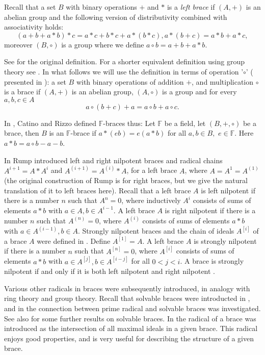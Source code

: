 \documentclass[12pt]{article}
\begin{document}
Recall that a set $B$ with binary operations $+$ and $* $ is a {\em  left brace} if $(A, +)$ is an abelian group and the following version of distributivity combined with associativity holds:
  \[(a+b+a*b)* c=a* c+b* c+a* (b* c), a* (b+c)=a* b+a* c,\]
 moreover  $(B, \circ )$ is a group where we define $a\circ b=a+b+a* b$.

 See \cite{rump} for the original definition. For a shorter equivalent  definition using group theory see \cite{cjo}.
In what follows we will use the definition in terms of operation '$\circ $' ( presented in \cite{cjo}): a set $B$ with binary operations of addition $+$, and multiplication $\circ $ is a brace if $(A, +)$ is an abelian group, $(A, \circ )$ is a group and for every $a,b,c\in A$
\[a\circ (b+c)+a=a\circ b+a\circ c.\]


 In \cite{Catino}, Catino and Rizzo defined
$\mathbb F$-braces thus:
 Let $\mathbb F$ be a field, let $(B, +, \circ )$ be a brace, then $B$ is an $\mathbb F$-brace if $a*(eb)=e(a* b)$ for all $a,b\in B,$
$ e\in \mathbb F$. Here $ a*b=a \circ b -a -b$.

In \cite{rump} Rump introduced left and right nilpotent braces and radical chains $A^{i+1}=A*A^{i}$ and $A^{(i+1)}=A^{(i)}*A$,  for a left brace $A$, where  $A=A^{1}=A^{(1)}$ (the original construction of Rump is for right braces, but we give the natural translation of it to left braces here). Recall that a left brace $A$  is left nilpotent if  there is a number $n$ such that $A^{n}=0$, where inductively $A^{i}$ consists of sums of elements $a*b$ with
$a\in A, b\in A^{i-1}$. A left brace $A$ is right nilpotent   if  there is a number $n$ such that $A^{(n)}=0$, where $A^{(i)}$ consists of sums of elements $a*b$ with
$a\in A^{(i-1)}, b\in A$.
 Strongly nilpotent braces and the chain of ideals $A^{[i]}$ of a brace $A$ were defined in \cite{Engel}.
 Define $A^{[1]}=A$.  A left brace $A$ is strongly nilpotent if  there is a number $n$ such that $A^{[n]}=0$, where $A^{[i]}$ consists of sums of elements $a*b$ with
$a\in A^{[j]}, b\in A^{[i-j]}$ for all $0<j<i$.
A   brace is strongly nilpotent if and only if it is both left nilpotent and right nilpotent \cite{Engel}.


  Various other radicals in braces were subsequently introduced, in analogy with ring theory and group theory. Recall that solvable braces were introducted in \cite{djc}, and in \cite{ksv} the  connection between prime radical and  solvable braces was investigated. See also \cite{kinneart} for some further results on solvable braces.
In \cite{JespersLeandro} the radical of a brace was  introduced as the intersection of all maximal ideals in a given brace. This radical enjoys good properties, and is very useful for describing the structure of a given brace. 
\end{document}
